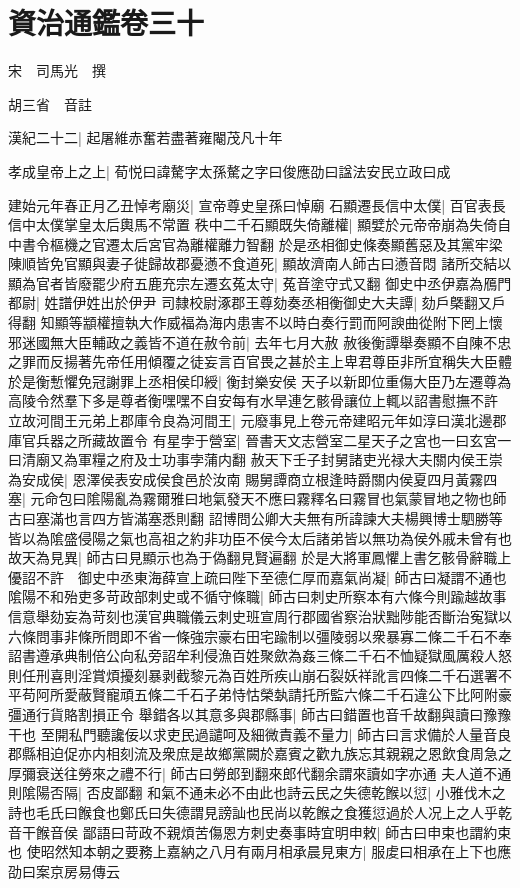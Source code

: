 \section{資治通鑑卷三十}
宋　司馬光　撰

胡三省　音註

漢紀二十二|{
	起屠維赤奮若盡著雍閹茂凡十年}


孝成皇帝上之上|{
	荀悦曰諱驁字太孫驁之字曰俊應劭曰諡法安民立政曰成}


建始元年春正月乙丑悼考廟災|{
	宣帝尊史皇孫曰悼廟}
石顯遷長信中太僕|{
	百官表長信中太僕掌皇太后輿馬不常置}
秩中二千石顯既失倚離權|{
	顯嬖於元帝帝崩為失倚自中書令樞機之官遷太后宮官為離權離力智翻}
於是丞相御史條奏顯舊惡及其黨牢梁陳順皆免官顯與妻子徙歸故郡憂懣不食道死|{
	顯故濟南人師古曰懣音悶}
諸所交結以顯為官者皆廢罷少府五鹿充宗左遷玄菟太守|{
	菟音塗守式又翻}
御史中丞伊嘉為鴈門都尉|{
	姓譜伊姓出於伊尹}
司隸校尉涿郡王尊劾奏丞相衡御史大夫譚|{
	劾戶槩翻又戶得翻}
知顯等顓權擅執大作威福為海内患害不以時白奏行罰而阿諛曲從附下罔上懷邪迷國無大臣輔政之義皆不道在赦令前|{
	去年七月大赦}
赦後衡譚舉奏顯不自陳不忠之罪而反揚著先帝任用傾覆之徒妄言百官畏之甚於主上卑君尊臣非所宜稱失大臣體於是衡慙懼免冠謝罪上丞相侯印綬|{
	衡封樂安侯}
天子以新即位重傷大臣乃左遷尊為高陵令然羣下多是尊者衡嘿嘿不自安每有水旱連乞骸骨讓位上輒以詔書慰撫不許　立故河間王元弟上郡庫令良為河間王|{
	元廢事見上卷元帝建昭元年如淳曰漢北邊郡庫官兵器之所藏故置令}
有星孛于營室|{
	晉書天文志營室二星天子之宮也一曰玄宮一曰清廟又為軍糧之府及士功事孛蒲内翻}
赦天下壬子封舅諸吏光禄大夫關内侯王崇為安成侯|{
	恩澤侯表安成侯食邑於汝南}
賜舅譚商立根逢時爵關内侯夏四月黃霧四塞|{
	元命包曰隂陽亂為霧爾雅曰地氣發天不應曰霧釋名曰霧冒也氣蒙冒地之物也師古曰塞滿也言四方皆滿塞悉則翻}
詔博問公卿大夫無有所諱諫大夫楊興博士駟勝等皆以為隂盛侵陽之氣也高祖之約非功臣不侯今太后諸弟皆以無功為侯外戚未曾有也故天為見異|{
	師古曰見顯示也為于偽翻見賢遍翻}
於是大將軍鳳懼上書乞骸骨辭職上優詔不許　御史中丞東海薛宣上疏曰陛下至德仁厚而嘉氣尚凝|{
	師古曰凝謂不通也}
隂陽不和殆吏多苛政部刺史或不循守條職|{
	師古曰刺史所察本有六條今則踰越故事信意舉劾妄為苛刻也漢官典職儀云刺史班宣周行郡國省察治狀黜陟能否斷治寃獄以六條問事非條所問即不省一條強宗豪右田宅踰制以彊陵弱以衆暴寡二條二千石不奉詔書遵承典制倍公向私旁詔牟利侵漁百姓聚歛為姦三條二千石不恤疑獄風厲殺人怒則任刑喜則淫賞煩擾刻暴剥截黎元為百姓所疾山崩石裂妖祥訛言四條二千石選署不平苟阿所愛蔽賢寵頑五條二千石子弟恃怙榮埶請托所監六條二千石違公下比阿附豪彊通行貨賂割損正令}
舉錯各以其意多與郡縣事|{
	師古曰錯置也音千故翻與讀曰豫豫干也}
至開私門聽讒佞以求吏民過譴呵及細微責義不量力|{
	師古曰言求備於人量音良}
郡縣相迫促亦内相刻流及衆庶是故鄉黨闕於嘉賓之歡九族忘其親親之恩飲食周急之厚彌衰送往勞來之禮不行|{
	師古曰勞郎到翻來郎代翻余謂來讀如字亦通}
夫人道不通則隂陽否隔|{
	否皮鄙翻}
和氣不通未必不由此也詩云民之失德乾餱以愆|{
	小雅伐木之詩也毛氏曰餱食也鄭氏曰失德謂見謗訕也民尚以乾餱之食獲愆過於人况上之人乎乾音干餱音侯}
鄙語曰苛政不親煩苦傷恩方刺史奏事時宜明申敕|{
	師古曰申束也謂約束也}
使昭然知本朝之要務上嘉納之八月有兩月相承晨見東方|{
	服䖍曰相承在上下也應劭曰案京房易傳云}


